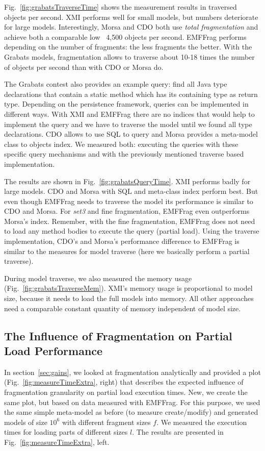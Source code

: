  Fig.~\ref{fig:grabatsTraverseTime} shows the measurement results in traversed objects per second. XMI performs well for small models, but numbers deteriorate for large models. Interestingly, Morsa and CDO both use \emph{total fragmentation} and achieve both a comparable low ~4,500 objects per second. EMFFrag performs depending on the number of fragments: the less fragments the better. With the Grabats models, fragmentation allows to traverse about 10-18 times the number of objects per second than with CDO or Morsa do.

 The Grabats contest also provides an example query: find all Java type declarations that contain a static method which has its containing type as return type. Depending on the persistence framework, queries can be implemented in different ways. With XMI and EMFFrag there are no indices that would help to implement the query and we have to traverse the model until we found all type declarations. CDO allows to use SQL to query and Morsa provides a meta-model class to objects index. We measured both: executing the queries with these specific query mechanisms and with the previously mentioned traverse based implementation.

The results are shown in Fig.~\ref{fig:grabatsQueryTime}. XMI performs badly for large models. CDO and Morsa with SQL and meta-class index perform best. But even though EMFFrag needs to traverse the model its performance is similar to CDO and Morsa. For \emph{set3} and fine fragmentation, EMFFrag even outperforms Morsa's index. Remember, with the fine fragmentation, EMFFrag does not need to load any method bodies to execute the query (partial load). Using the traverse implementation, CDO's and Morsa's performance difference to EMFFrag is similar to the measures for model traverse (here we basically perform a partial traverse).  

 During model traverse, we also measured the memory usage (Fig.~\ref{fig:grabatsTraverseMem}). XMI's memory usage is proportional to model size, because it needs to load the full models into memory. All other approaches need a comparable constant quantity of memory independent of model size.

\subsection{The Influence of Fragmentation on Partial Load Performance}

In section~\ref{sec:gains}, we looked at fragmentation analytically and provided a plot (Fig.~\ref{fig:measureTimeExtra}, right) that describes the expected influence of fragmentation granularity on partial load execution times. New, we create the same plot, but based on data measured with EMFFrag. For this purpose, we used the same simple meta-model as before (to measure create/modify) and generated models of size $10^6$ with different fragment sizes $f$. We measured the execution times for loading parts of different sizes $l$. The results are presented in Fig.~\ref{fig:measureTimeExtra}, left.

